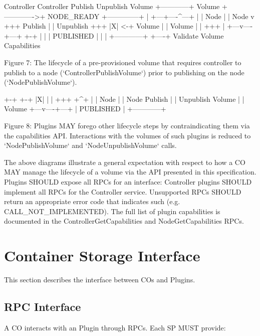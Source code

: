 \documentclass[12pt]{article}
\begin{document}
\begin{bashcode}
    Controller                  Controller
       Publish                  Unpublish
        Volume  +------------+  Volume
 +------------->+ NODE_READY +--------------+
 |              +---+----^---+              |
 |             Node |    | Node             v
+++         Publish |    | Unpublish       +++
|X| <-+      Volume |    | Volume          | |
+++   |         +---v----+---+             +-+
 |    |         | PUBLISHED  |
 |    |         +------------+
 +----+
   Validate
   Volume
   Capabilities

Figure 7: The lifecycle of a pre-provisioned volume that requires
controller to publish to a node (`ControllerPublishVolume`) prior to
publishing on the node (`NodePublishVolume`).
\end{bashcode}

\begin{bashcode}
       +-+  +-+
       |X|  | |
       +++  +^+
        |    |
   Node |    | Node
Publish |    | Unpublish
 Volume |    | Volume
    +---v----+---+
    | PUBLISHED  |
    +------------+

Figure 8: Plugins MAY forego other lifecycle steps by contraindicating
them via the capabilities API. Interactions with the volumes of such
plugins is reduced to `NodePublishVolume` and `NodeUnpublishVolume`
calls.
\end{bashcode}

The above diagrams illustrate a general expectation with respect to how
a CO MAY manage the lifecycle of a volume via the API presented in this
specification. Plugins SHOULD expose all RPCs for an interface:
Controller plugins SHOULD implement all RPCs for the Controller service.
Unsupported RPCs SHOULD return an appropriate error code that indicates
such (e.g. CALL\_NOT\_IMPLEMENTED). The full list of plugin capabilities
is documented in the ControllerGetCapabilities and NodeGetCapabilities
RPCs.

\newpage
\section{Container Storage Interface}
This section describes the interface between COs and Plugins.
\subsection{RPC Interface}

A CO interacts with an Plugin through RPCs. Each SP MUST provide: \\
\end{document}
